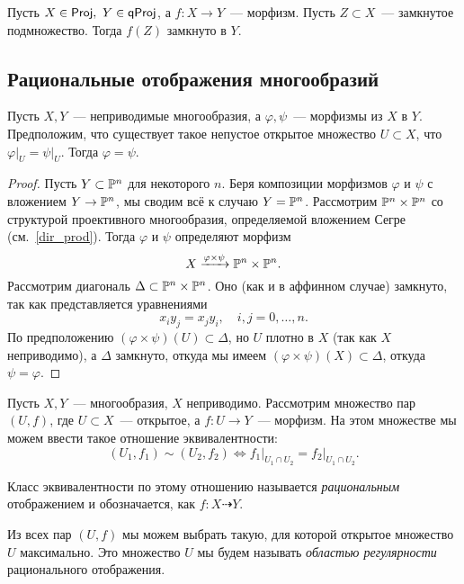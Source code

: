 	\begin{corollary}
		Пусть $X \in \mathsf{Proj}, \ Y \in \mathsf{qProj}$, а $f \colon X \to Y$~--- морфизм. Пусть $Z \subset X$~--- замкнутое подмножество. Тогда $f(Z)$ замкнуто в $Y$.
	\end{corollary}

	\subsection{Рациональные отображения многообразий }

	\begin{lemma}\label{rat_cor} 
		Пусть $X, Y$~--- неприводимые многообразия, а $\varphi, \psi$~--- морфизмы из $X$ в $Y$. Предположим, что существует такое непустое открытое множество $U \subset X$, что $\varphi\vert_{U} = \psi\vert_{U}$. Тогда $\varphi = \psi$.
	\end{lemma}
	\begin{proof}
		Пусть $Y \subset \mathbb{P}^n$ для некоторого $n$. Беря композиции морфизмов $\varphi$ и $\psi$ с вложением $Y \to \mathbb{P}^n$, мы сводим всё к случаю $Y = \mathbb{P}^n$. Рассмотрим $\mathbb{P}^n \times \mathbb{P}^n$ со структурой проективного многообразия, определяемой вложением Сегре (см.~\ref{dir_prod}). Тогда $\varphi$ и $\psi$ определяют морфизм 
		\[
			X \xrightarrow{\varphi \times \psi} \mathbb{P}^n \times \mathbb{P}^n.
		\]
		Рассмотрим диагональ $\Delta \subset \mathbb{P}^n \times \mathbb{P}^n$. Оно (как и в аффинном случае) замкнуто, так как представляется уравнениями 
		\[
			x_i y_j = x_j y_i , \quad i, j = 0, \ldots, n.
		\]
		По предположению $(\varphi \times \psi)(U) \subset \Delta$, но $U$ плотно в $X$ (так как $X$ неприводимо), а $\Delta$ замкнуто, откуда мы имеем $(\varphi \times \psi)(X) \subset \Delta$, откуда $\psi = \varphi$. 
	\end{proof}

	\begin{definition} 
		Пусть $X, Y$~--- многообразия, $X$ неприводимо. Рассмотрим множество пар $(U, f)$, где $U \subset X$~--- открытое, а $f\colon U \to Y$~--- морфизм. На этом множестве мы можем ввести такое отношение эквивалентности: 
		\[
			(U_1, f_1) \sim (U_2, f_2) \Leftrightarrow f_1\vert_{U_1 \cap U_2} = f_2\vert_{U_1 \cap U_2}.
		\]

		Класс эквивалентности по этому отношению называется \emph{рациональным} отображением и обозначается, как $f\colon X \dashrightarrow Y$.

		Из всех пар $(U, f)$ мы можем выбрать такую, для которой открытое множество $U$ максимально. Это множество $U$ мы будем называть \emph{областью регулярности} рационального отображения. 
	\end{definition}

